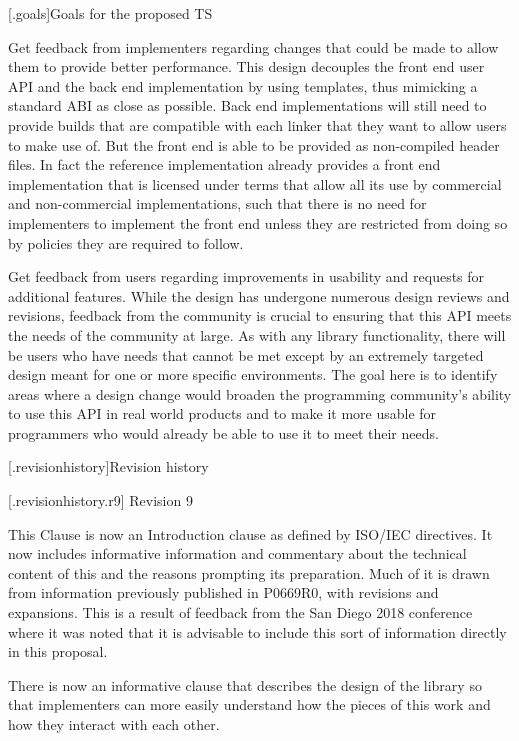 [\iotwod.goals]{Goals for the proposed TS}

\pnum
Get feedback from implementers regarding changes that could be made to allow them to provide better performance. This design decouples the front end user API and the back end implementation by using templates, thus mimicking a standard ABI as close as possible. Back end implementations will still need to provide builds that are compatible with each linker that they want to allow users to make use of. But the front end is able to be provided as non-compiled header files. In fact the reference implementation already provides a front end implementation that is licensed under terms that allow all its use by commercial and non-commercial implementations, such that there is no need for implementers to implement the front end unless they are restricted from doing so by policies they are required to follow.

\pnum
Get feedback from users regarding improvements in usability and requests for additional features. While the design has undergone numerous design reviews and revisions, feedback from the \Cpp{} community is crucial to ensuring that this API meets the needs of the community at large. As with any library functionality, there will be users who have needs that cannot be met except by an extremely targeted design meant for one or more specific environments. The goal here is to identify areas where a design change would broaden the \Cpp{} programming community's ability to use this API in real world products and to make it more usable for \Cpp{} programmers who would already be able to use it to meet their needs.

[\iotwod.revisionhistory]{Revision history}

 [\iotwod.revisionhistory.r9] {Revision 9}

\pnum
This Clause is now an Introduction clause as defined by ISO/IEC directives. It now includes informative information and commentary about the technical content of this \documenttypename{} and the reasons prompting its preparation. Much of it is drawn from information previously published in P0669R0, with revisions and expansions. This is a result of feedback from the San Diego 2018 conference where it was noted that it is advisable to include this sort of information directly in this proposal.

\pnum
There is now an informative clause that describes the design of the library so that implementers can more easily understand how the pieces of this \documenttypename{} work and how they interact with each other.

